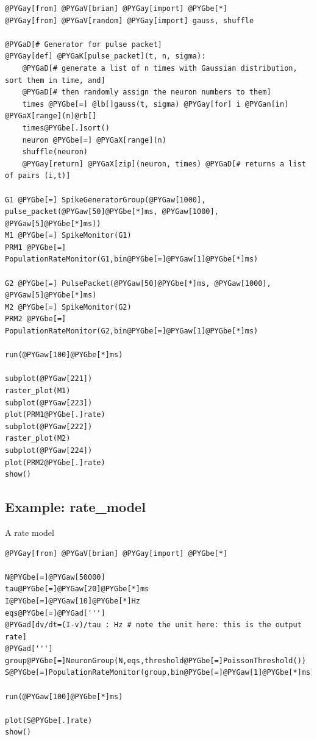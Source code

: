 \documentclass[letterpaper,10pt]{manual}
\begin{document}
\begin{Verbatim}[commandchars=@\[\]]
@PYGay[from] @PYGaV[brian] @PYGay[import] @PYGbe[*]
@PYGay[from] @PYGaV[random] @PYGay[import] gauss, shuffle

@PYGaD[# Generator for pulse packet]
@PYGay[def] @PYGaK[pulse_packet](t, n, sigma):
    @PYGaD[# generate a list of n times with Gaussian distribution, sort them in time, and]
    @PYGaD[# then randomly assign the neuron numbers to them]
    times @PYGbe[=] @lb[]gauss(t, sigma) @PYGay[for] i @PYGan[in] @PYGaX[range](n)@rb[]
    times@PYGbe[.]sort()
    neuron @PYGbe[=] @PYGaX[range](n)
    shuffle(neuron)
    @PYGay[return] @PYGaX[zip](neuron, times) @PYGaD[# returns a list of pairs (i,t)]

G1 @PYGbe[=] SpikeGeneratorGroup(@PYGaw[1000], pulse_packet(@PYGaw[50]@PYGbe[*]ms, @PYGaw[1000], @PYGaw[5]@PYGbe[*]ms))
M1 @PYGbe[=] SpikeMonitor(G1)
PRM1 @PYGbe[=] PopulationRateMonitor(G1,bin@PYGbe[=]@PYGaw[1]@PYGbe[*]ms)

G2 @PYGbe[=] PulsePacket(@PYGaw[50]@PYGbe[*]ms, @PYGaw[1000], @PYGaw[5]@PYGbe[*]ms)
M2 @PYGbe[=] SpikeMonitor(G2)
PRM2 @PYGbe[=] PopulationRateMonitor(G2,bin@PYGbe[=]@PYGaw[1]@PYGbe[*]ms)

run(@PYGaw[100]@PYGbe[*]ms)

subplot(@PYGaw[221])
raster_plot(M1)
subplot(@PYGaw[223])
plot(PRM1@PYGbe[.]rate)
subplot(@PYGaw[222])
raster_plot(M2)
subplot(@PYGaw[224])
plot(PRM2@PYGbe[.]rate)
show()
\end{Verbatim}

\resetcurrentobjects
{}

\hypertarget{index-49}{}\subsection{Example: rate\_model}

A rate model

\begin{Verbatim}[commandchars=@\[\]]
@PYGay[from] @PYGaV[brian] @PYGay[import] @PYGbe[*]

N@PYGbe[=]@PYGaw[50000]
tau@PYGbe[=]@PYGaw[20]@PYGbe[*]ms
I@PYGbe[=]@PYGaw[10]@PYGbe[*]Hz
eqs@PYGbe[=]@PYGad[''']
@PYGad[dv/dt=(I-v)/tau : Hz # note the unit here: this is the output rate]
@PYGad[''']
group@PYGbe[=]NeuronGroup(N,eqs,threshold@PYGbe[=]PoissonThreshold())
S@PYGbe[=]PopulationRateMonitor(group,bin@PYGbe[=]@PYGaw[1]@PYGbe[*]ms)

run(@PYGaw[100]@PYGbe[*]ms)

plot(S@PYGbe[.]rate)
show()
\end{Verbatim}
\end{document}
